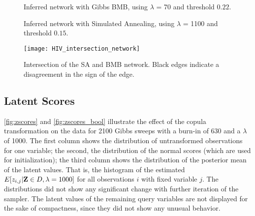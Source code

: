 \begin{figure}
	\centering
	\caption{Inferred network with Gibbs BMB, using $\lambda$ = 70 and threshold $0.22$.}
	\label{fig:network_gibbs}
\end{figure}
\begin{figure}
	\centering
	
	\caption{Inferred network with Simulated Annealing, using $\lambda$ = 1100 and threshold $0.15$.}
	
	\label{fig:network_SA}
\end{figure}
\begin{figure}
	\centering
	\texttt{[image: HIV\_intersection\_network]}
	\caption{Intersection of the SA and BMB network. Black edges indicate a disagreement in the sign of the edge.}
	
	\label{fig:intersection}
\end{figure}

\FloatBarrier
\subsection{Latent Scores}
\autoref{fig:zscores} and \autoref{fig:zscores_bool} illustrate the effect of the copula transformation on the data
for 2100 Gibbs sweeps with a burn-in of 630 and a $\lambda$ of 1000.
The first column shows the distribution of untransformed observations for one variable;
the second, the distribution of the normal scores (which are used for initialization);
the third column shows the distribution of the posterior mean of the latent values.
That is, the histogram of the estimated $E[z_{i,j}|\mathbf{Z}\in D, \lambda=1000]$ for all observations $i$ with fixed variable $j$.
The distributions did not show any significant change with further iteration of the sampler.
The latent values of the remaining query variables are not displayed for the sake of compactness, since they did not show 
any unusual behavior.

